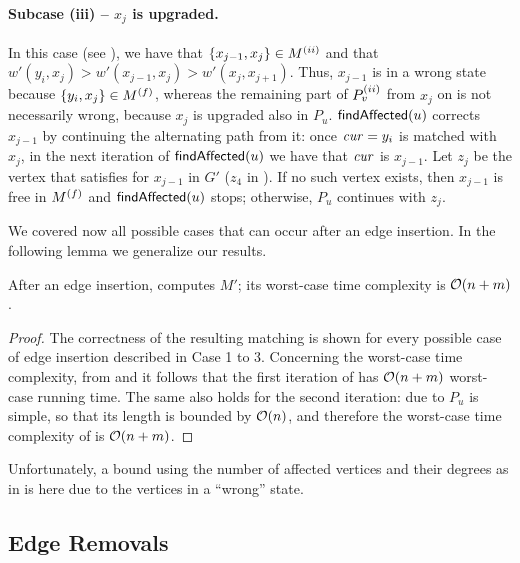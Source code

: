 \paragraph{Subcase (iii) -- $x_j$ is upgraded.}
In this case (see ), we have that $\set{x_{j-1}, x_j}\in M\iinterm$
and that $w'(y_i, x_j) > w'(x_{j - 1}, x_j) > w'(x_j, x_{j + 1})$.
Thus, $x_{j - 1}$ is in a wrong state because $\set{y_i, x_j}\in M\final$, whereas
the remaining part of $P_v^{(ii)}$ from $x_j$ on is not necessarily wrong,
because $x_j$ is upgraded also in $P_u$.
$\textsf{findAffected}(u)$ corrects $x_{j - 1}$ by continuing the alternating path from it:
once $\mathit{cur} = y_i$ is matched with $x_j$, in the next iteration of $\textsf{findAffected}(u)$
we have that $\mathit{cur}$ is $x_{j - 1}$.
%
Let $z_j$ be the vertex that satisfies 
for $x_{j - 1}$ in $G'$ (\eg $z_4$ in ).
If no such vertex exists, then $x_{j - 1}$ is free in $M^{(f)}$ and
$\textsf{findAffected}(u)$ stops; otherwise, $P_u$ continues with $z_j$.

We covered now all possible cases that can occur after an edge insertion.
In the following lemma we generalize our results.

\begin{proposition}
\label{prop:dyn-mwm:edge-insertion-time-1}
After an edge insertion,  computes
$M'$; its worst-case time complexity is $\mathcal{O}(n + m)$.
\end{proposition}

\begin{proof}
The correctness of the resulting matching is shown for every possible case of
edge insertion described in Case 1 to 3. Concerning the worst-case time
complexity, from  and
 it follows that the first
iteration of  has $\mathcal{O}(n + m)$ worst-case
running time. The same also holds for the second iteration: due to
 $P_u$ is simple, so that its length is
bounded by $\mathcal{O}(n)$, and therefore the worst-case time complexity of
 is $\mathcal{O}(n + m)$.
\end{proof}

Unfortunately, a bound using the number of affected vertices
and their degrees as in  is
 here due to the vertices in a \enquote{wrong}
state.


\subsection{Edge Removals}
\label{sec:dyn-mwm:single-removals}

